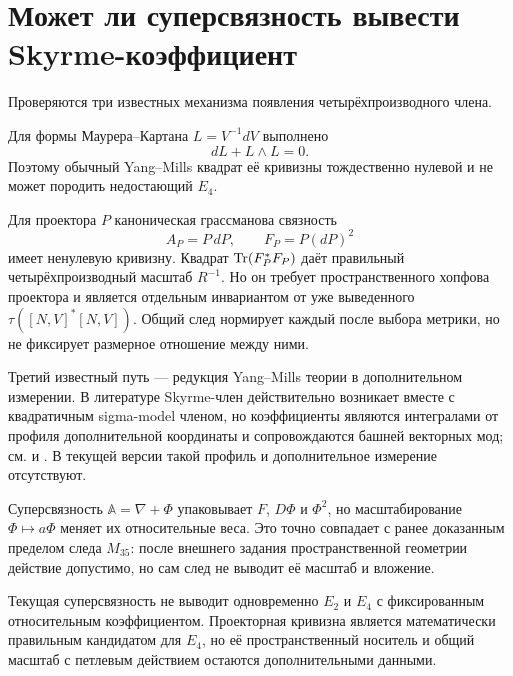 \chapter{Может ли суперсвязность вывести Skyrme-коэффициент}

Проверяются три известных механизма появления четырёхпроизводного члена.

Для формы Маурера--Картана $L=V^{-1}dV$ выполнено
\begin{equation}
 dL+L\wedge L=0.
\end{equation}
Поэтому обычный Yang--Mills квадрат её кривизны тождественно нулевой и не
может породить недостающий $E_4$.

Для проектора $P$ каноническая грассманова связность
\begin{equation}
 A_P=P\,dP,
 \qquad F_P=P(dP)^2
\end{equation}
имеет ненулевую кривизну. Квадрат $\operatorname{Tr}(F_P^*F_P)$ даёт правильный
четырёхпроизводный масштаб $R^{-1}$. Но он требует пространственного
хопфова проектора и является отдельным инвариантом от уже выведенного
$\tau([N,V]^*[N,V])$. Общий след нормирует каждый после выбора метрики,
но не фиксирует размерное отношение между ними.

Третий известный путь --- редукция Yang--Mills теории в дополнительном
измерении. В литературе Skyrme-член действительно возникает вместе с
квадратичным sigma-model членом, но коэффициенты являются интегралами от
профиля дополнительной координаты и сопровождаются башней векторных мод;
см.  и .
В текущей версии такой профиль и дополнительное измерение отсутствуют.

Суперсвязность $\mathbb A=\nabla+\Phi$ упаковывает $F$, $D\Phi$ и
$\Phi^2$, но масштабирование $\Phi\mapsto a\Phi$ меняет их относительные
веса. Это точно совпадает с ранее доказанным пределом следа $M_{35}$:
после внешнего задания пространственной геометрии действие допустимо, но
сам след не выводит её масштаб и вложение.

\begin{theorem}
Текущая суперсвязность не выводит одновременно $E_2$ и $E_4$ с
фиксированным относительным коэффициентом. Проекторная кривизна является
математически правильным кандидатом для $E_4$, но её пространственный
носитель и общий масштаб с петлевым действием остаются дополнительными
данными.
\end{theorem}

